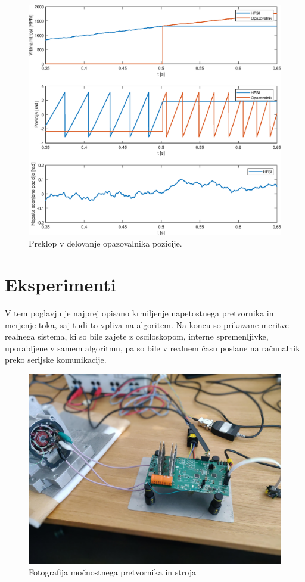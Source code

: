 \documentclass[a4paper,twoside,openright,12pt,slovene]{book}
\begin{document}
\begin{figure}[!htbp]
    \centering
    \includegraphics[width=1\columnwidth]{Slike/brezudarniPreklop.eps}
    \caption{\label{brezudarniPreklop} Preklop v delovanje opazovalnika pozicije. }
\end{figure}

\chapter{Eksperimenti}  \label{eksperimenti}

V tem poglavju je najprej opisano krmiljenje napetostnega pretvornika in merjenje toka, saj tudi to vpliva na algoritem. Na koncu so prikazane meritve realnega sistema, ki so bile zajete z
osciloskopom, interne spremenljivke, uporabljene v samem algoritmu, pa so bile v realnem času poslane na računalnik preko serijske komunikacije.

\begin{figure}[!htbp]
    \centering
    \includegraphics[width=0.75\columnwidth]{Slike/EksperimentiSlika.jpg}
    \caption{\label{experimentiSlika} Fotografija močnostnega pretvornika in stroja}
\end{figure}
\end{document}
